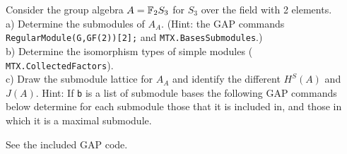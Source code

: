 \documentclass[leqno]{article}
\begin{document}
\newpage
\begin{problem}
Consider the group algebra $A=\mathbb{F}_2S_3$ for $S_3$ over the field with 2
elements.\\
a) Determine the submodules of $A_A$. (Hint: the {\sf GAP} commands {\tt
RegularModule(G,GF(2))[2];} and {\tt MTX.BasesSubmodules}.)\\
b) Determine the isomorphism types of simple modules ({\tt
MTX.CollectedFactors}).\\
c) Draw the submodule lattice for $A_A$ and identify the different $H^S(A)$
and $J(A)$. Hint: If {\tt b} is a list of submodule bases the following
{\sf GAP} commands below determine for each submodule those that it is included
in, and those in which it is a maximal submodule.
\end{problem}
\begin{solution}
See the included \textsf{GAP} code.

\end{solution}
\end{document}
